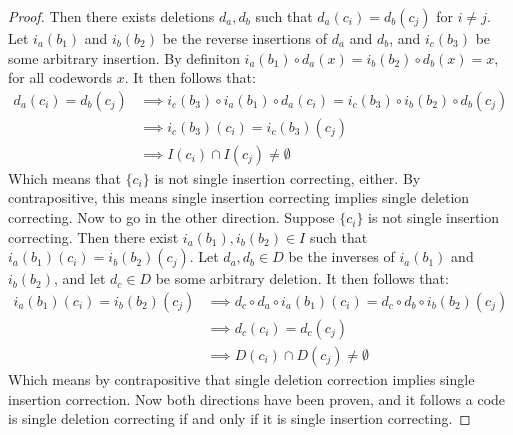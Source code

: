 \documentclass{article}
\begin{document}
\begin{enumerate}[(a)]
\begin{enumerate}[(i)]
\begin{proof}
          Then there exists deletions $d_a, d_b$ such that $d_a(c_i) =
          d_b(c_j)$ for $i \neq j$. Let $i_a(b_1)$ and $i_b(b_2)$ be the
          reverse insertions of $d_a$ and $d_b$, and $i_c(b_3)$ be some
          arbitrary insertion. By definiton $i_a(b_1) \circ d_a (x)= i_b(b_2)
          \circ d_b (x)= x$, for all codewords $x$. It then follows that:
          \begin{align*}
            d_a(c_i) = d_b(c_j) & \implies i_c(b_3) \circ i_a(b_1) \circ
                d_a (c_i) = i_c(b_3) \circ i_b(b_2) \circ d_b (c_j) \\
              & \implies i_c(b_3)(c_i) = i_c(b_3)(c_j) \\
              & \implies I(c_i) \cap I(c_j) \neq \emptyset
          \end{align*}
          Which means that $\{c_i\}$ is not single insertion correcting,
          either. By contrapositive, this means single insertion correcting
          implies single deletion correcting. Now to go in the other
          direction. Suppose $\{c_i\}$ is not single insertion correcting.
          Then there exist $i_a(b_1), i_b(b_2) \in I$ such that $i_a(b_1)(c_i)
          = i_b(b_2)(c_j)$. Let $d_a, d_b \in D$ be the inverses of $i_a(b_1)$
          and $i_b(b_2)$, and let $d_c \in D$ be some arbitrary deletion. It
          then follows that:
          \begin{align*}
            i_a(b_1)(c_i) = i_b(b_2)(c_j) & \implies d_c \circ d_a \circ
                i_a(b_1)(c_i) = d_c \circ d_b \circ i_b(b_2)(c_j) \\
              & \implies d_c (c_i) = d_c (c_j) \\
              & \implies D(c_i) \cap D(c_j) \neq \emptyset
          \end{align*}
          Which means by contrapositive that single deletion correction
          implies single insertion correction. Now both directions have been
          proven, and it follows a code is single deletion correcting if and
          only if it is single insertion correcting.
        \end{proof}
    \end{enumerate}
\end{enumerate}
\end{document}
